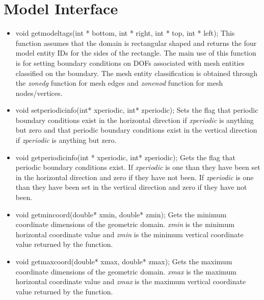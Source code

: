 \section{Model Interface}
\begin{itemize}
\item  void getmodeltags(int * bottom, int * right, int * top, int * left); This
function assumes that the domain is rectangular shaped and returns the four model entity 
IDs for the sides of the rectangle.  The main use of this function is for setting boundary 
conditions on DOFs associated with mesh entities classified on the boundary.  The mesh entity
classification is obtained through the \textit{zonedg} function 
for mesh edges and \textit{zonenod} function for
mesh nodes/vertices.
\item  void setperiodicinfo(int* xperiodic, int* zperiodic); Sets the flag that periodic
boundary conditions exist in the horizontal direction if \textit{xperiodic} is anything but zero
and that periodic
boundary conditions exist in the vertical direction if \textit{zperiodic} is anything but zero.
\item  void getperiodicinfo(int * xperiodic, int* zperiodic);	Gets the flag that periodic
boundary conditions exist.  If \textit{xperiodic} is one than they have been set in
the horizontal direction and zero if they have not been. If
 \textit{zperiodic} is one than they have been set in
the vertical direction and zero if they have not been.
\item  void getmincoord(double* xmin, double* zmin); Gets the minimum coordinate dimensions of the geometric domain. 
\textit{xmin} is the minimum horizontal coordinate value and \textit{zmin} is the minimum vertical coordinate value
returned by the function.
\item  void getmaxcoord(double* xmax, double* zmax); Gets the maximum coordinate dimensions of the geometric domain.  
\textit{xmax} is the maximum horizontal coordinate value and \textit{zmax} is the maximum vertical coordinate value
returned by the function.
\end{itemize}

